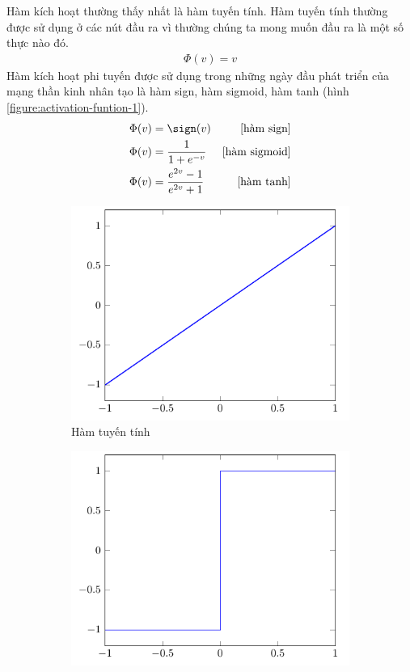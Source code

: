 Hàm kích hoạt thường thấy nhất là hàm tuyến tính. Hàm tuyến tính thường được sử dụng ở các nút đầu ra vì thường chúng ta mong muốn đầu ra là một số thực nào đó.
\begin{align}
    \Phi(v)=v
\end{align}
Hàm kích hoạt phi tuyến được sử dụng trong những ngày đầu phát triển của mạng thần kinh nhân tạo là hàm sign, hàm sigmoid, hàm tanh (hình \ref{figure:activation-funtion-1}).
\begin{align}
    \Phi(v) & =\sign(v)                   & \text{[hàm sign]}    \\
    \Phi(v) & =\dfrac{1}{1+e^{-v}}        & \text{[hàm sigmoid]} \\
    \Phi(v) & =\dfrac{e^{2v}-1}{e^{2v}+1} & \text{[hàm tanh]}
\end{align}
\begin{figure}[htb]
    \centering
    \begin{subfigure}[htbp]{0.25\textwidth}
        \centering
        \includegraphics[width=\textwidth]{tikz_image/identity.pdf}
        \caption{Hàm tuyến tính}
    \end{subfigure}%
    \begin{subfigure}[htbp]{0.25\textwidth}
        \centering
        \includegraphics[width=\textwidth]{tikz_image/sign.pdf}

\end{subfigure}
\end{figure}
